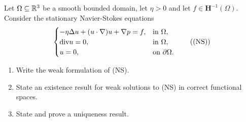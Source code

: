 \newpage
\begin{exercise}
    Let \(\Omega \subseteq \mathbb{R}^3\) be a smooth bounded domain, let \(\eta > 0\) and let \(f \in \bm{H}^{-1}(\Omega)\). Consider the stationary Navier-Stokes equations
    \begin{equation*}
        \begin{cases}
            -\eta \Delta u + (u \cdot \nabla) u + \nabla p = f, & \text{in } \Omega, \\
            \text{div} u = 0, & \text{in } \Omega, \\
            u = 0, & \text{on } \partial \Omega.
        \end{cases}
        \tag{(NS)}
    \end{equation*}
    \begin{enumerate}
        \item Write the weak formulation of (NS).
        \item State an existence result for weak solutions to (NS) in correct functional spaces.
        \item State and prove a uniqueness result.
    \end{enumerate}
\end{exercise}
